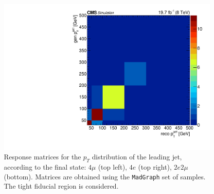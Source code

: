 \begin{figure}[hbtp]
\begin{center}
    \includegraphics[width=\cmsFigWidth]{Figures/ResMat_qqggJJ_PtJet1_ZZTo2e2m_st_01_fr_Mad}     
    \caption{Response matrices for the $p_{T}$ distribution of the leading jet, according to the final state:  $4\mu$ (top left), $4e$ (top right), $2e2\mu$  (bottom). Matrices are obtained using the  \texttt{MadGraph} set of samples. The tight fiducial region is considered. } 
    \label{fig:PtJet1_matrices}
  \end{center}
\end{figure}
